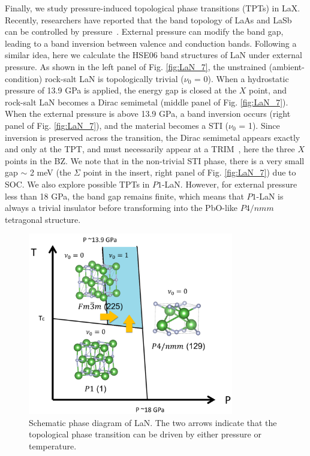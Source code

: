 	Finally, we study pressure-induced topological phase transitions (TPTs) in LaX. Recently, researchers have reported that the band topology of LaAs and LaSb can be controlled by pressure~\cite{LaAs_hydrostatic_pressure,  LaSb_topo_transition_HSE_guo2017}. External pressure can modify the band gap, leading to a band inversion between valence and conduction bands. Following a similar idea, here we calculate the HSE06 band structures of LaN under external pressure. As shown in the left panel of Fig. \ref{fig:LaN_7}, the unstrained (ambient-condition) rock-salt LaN is topologically trivial ($\nu_0$ = 0). When a hydrostatic pressure of 13.9 GPa is applied, the energy gap is closed at the $X$ point, and rock-salt LaN becomes a Dirac semimetal (middle panel of Fig. \ref{fig:LaN_7}). When the external pressure is above 13.9 GPa, a band inversion occurs (right panel of Fig. \ref{fig:LaN_7}), and the material becomes a STI ($\nu_0$ = 1). Since inversion is preserved across the transition, the Dirac semimetal appears exactly and only at the TPT, and must necessarily appear at a TRIM~\cite{murakami2007,murakami2008}, here the three $X$ points in the BZ. We note that in the non-trivial STI phase, there is a very small gap $\sim$ 2 meV (the $\Sigma$ point in the insert, right panel of Fig. \ref{fig:LaN_7}) due to SOC. We also explore possible TPTs in $P1$-LaN. However, for external pressure less than 18 GPa, the band gap remains finite, which means that $P1$-LaN is always a trivial insulator before transforming into the PbO-like $P4/nmm$ tetragonal structure.	

	\begin{figure}[ht!]
	    \centering
        \captionsetup{singlelinecheck = false, justification=justified}	
		\includegraphics[width=0.8\textwidth]{LaN_phase_diagram.png}
		\caption[Schematic phase diagram of LaN.]{Schematic phase diagram of LaN. The two arrows indicate that the topological phase transition can be driven by either pressure or temperature.}
		\label{fig:LaN_phase_diagram}
	\end{figure}


